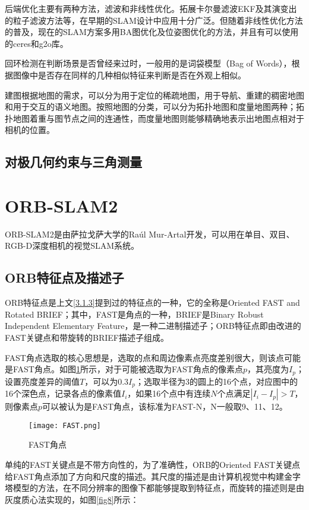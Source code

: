 后端优化主要有两种方法，滤波和非线性优化。拓展卡尔曼滤波EKF及其演变出的粒子滤波方法等，在早期的SLAM设计中应用十分广泛。但随着非线性优化方法的普及，现在的SLAM方案多用BA图优化及位姿图优化的方法，并且有可以使用的ceres和g2o库。

回环检测在判断场景是否曾经来过时，一般用的是词袋模型（Bag of Words），根据图像中是否存在同样的几种相似特征来判断是否在外观上相似。

建图根据地图的需求，可以分为用于定位的稀疏地图，用于导航、重建的稠密地图和用于交互的语义地图。按照地图的分类，可以分为拓扑地图和度量地图两种；拓扑地图着重与图节点之间的连通性，而度量地图则能够精确地表示出地图点相对于相机的位置。


\subsection{对极几何约束与三角测量} \label{3.1.4}


\section{ORB-SLAM2}

ORB-SLAM2是由萨拉戈萨大学的Raúl Mur-Artal开发，可以用在单目、双目、RGB-D深度相机的视觉SLAM系统。

\subsection{ORB特征点及描述子} \label{3.2.1}

ORB特征点是上文\ref{3.1.3}提到过的特征点的一种，它的全称是Oriented FAST and Rotated BRIEF；其中，FAST是角点的一种，BRIEF是Binary Robust Independent Elementary Feature，是一种二进制描述子；ORB特征点即由改进的FAST关键点和带旋转的BRIEF描述子组成。

FAST角点选取的核心思想是，选取的点和周边像素点亮度差别很大，则该点可能是FAST角点。如图\ref{fig7}所示，对于可能被选取为FAST角点的像素点$p$，其亮度为$I_p$；设置亮度差异的阈值$T$，可以为$0.3I_p$；选取半径为3的圆上的16个点，对应图中的16个深色点，记录各点的像素值$I_i$，如果16个点中有连续$N$个点满足$|I_i-I_p|>T$，则像素点$p$可以被认为是FAST角点，该标准为FAST-N，N一般取9、11、12。

\begin{figure}[!ht]
	\centering
	\texttt{[image: FAST.png]}
	\caption{FAST角点} 
	\label{fig7}
\end{figure}

单纯的FAST关键点是不带方向性的，为了准确性，ORB的Oriented FAST关键点给FAST角点添加了方向和尺度的描述。其尺度的描述是由计算机视觉中构建金字塔模型的方法，在不同分辨率的图像下都能够提取到特征点，而旋转的描述则是由灰度质心法实现的，如图\ref{fig8}所示：

